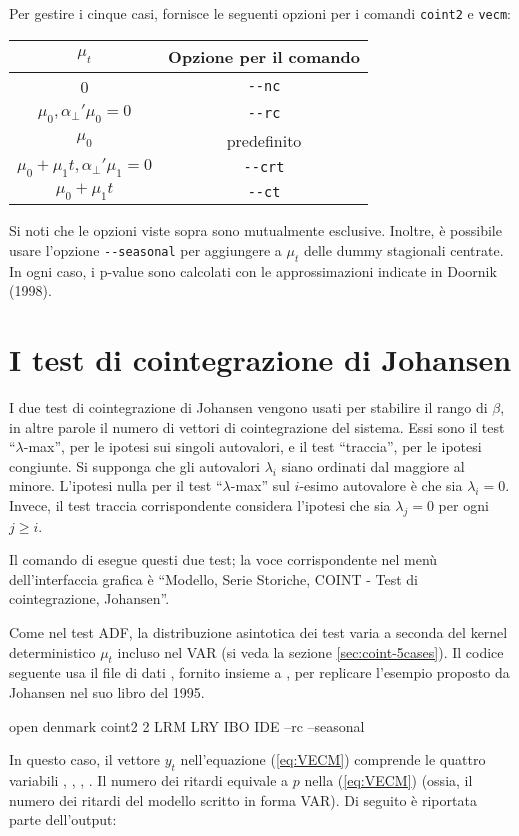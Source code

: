 Per gestire i cinque casi,  fornisce le seguenti opzioni per i
comandi \texttt{coint2} e \texttt{vecm}:
\begin{center}
  \begin{tabular}{cc}
    \hline
    $\mu_t$ & Opzione per il comando \\
    \hline
    0 & \verb|--nc| \\
    $\mu_0, \alpha_{\perp}'\mu_0 = 0 $ &  \verb|--rc| \\
    $\mu_0$ &  predefinito \\
    $\mu_0 + \mu_1 t , \alpha_{\perp}'\mu_1 = 0$ &  \verb|--crt| \\
    $\mu_0 + \mu_1 t$ &  \verb|--ct| \\
    \hline
  \end{tabular}
\end{center}
Si noti che le opzioni viste sopra sono mutualmente esclusive. Inoltre, è
possibile usare l'opzione \verb|--seasonal| per aggiungere a $\mu_t$ delle
dummy stagionali centrate. In ogni caso, i p-value sono calcolati con le
approssimazioni indicate in Doornik (1998).

\section{I test di cointegrazione di Johansen}
\label{sec:johansen-test}

I due test di cointegrazione di Johansen vengono usati per stabilire il
rango di $\beta$, in altre parole il numero di vettori di cointegrazione
del sistema. Essi sono il test ``$\lambda$-max'', per le ipotesi sui singoli
autovalori, e il test ``traccia'', per le ipotesi congiunte.
Si supponga che gli autovalori $\lambda_i$ siano ordinati dal maggiore al
minore. L'ipotesi nulla per il test  ``$\lambda$-max'' sul
$i$-esimo autovalore è che sia $\lambda_i = 0$. Invece, il test traccia
corrispondente considera l'ipotesi che sia $\lambda_j = 0$ per ogni
$j \ge i$.

Il comando  di  esegue questi due test; la voce
corrispondente nel menù dell'interfaccia grafica è ``Modello, Serie Storiche,
COINT - Test di cointegrazione, Johansen''.

Come nel test ADF, la distribuzione asintotica dei test varia a seconda
del kernel deterministico $\mu_t$ incluso nel VAR (si veda la sezione
\ref{sec:coint-5cases}). Il codice seguente usa il file di dati
, fornito insieme a , per replicare l'esempio proposto
da Johansen nel suo libro del 1995.
%
\begin{code}
open denmark
coint2 2 LRM LRY IBO IDE --rc --seasonal
\end{code}
%
In questo caso, il vettore $y_t$ nell'equazione (\ref{eq:VECM}) comprende le
quattro variabili , , , . Il numero dei
ritardi equivale a $p$ nella (\ref{eq:VECM}) (ossia, il numero dei ritardi del
modello scritto in forma VAR). Di seguito è riportata parte
dell'output:


